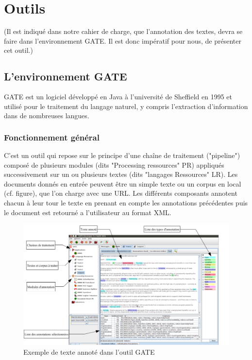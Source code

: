 \documentclass[a4paper, 11pt]{report}
\begin{document}
\section{Outils}%
(Il est indiqué dans notre cahier de charge, que l'annotation des textes, devra se faire dans l'environnement GATE. Il est donc impératif pour nous, de présenter cet outil.)
\subsection{L'environnement GATE}
GATE est un logiciel développé en Java à l’université de Sheffield en 1995 et utilisé pour
le traitement du langage naturel, y compris l’extraction d’information dans de nombreuses
langues. 
\subsubsection{Fonctionnement général}
C'est un outil qui repose sur le principe d'une chaîne de traitement ("pipeline") composé de plusieurs modules (dits "Processing ressources" PR) appliqués successivement sur un ou plusieurs textes (dits "langages Ressources" LR). Les documents donnés en entrée peuvent être un simple texte ou un corpus en local (cf. figure), que l'on charge avec une URL. Les différents composants annotent chacun à leur tour le texte en prenant en compte les annotations précédentes puis le document est retourné a l'utilisateur au format XML.
\begin{figure}[H]
\begin{center}
\includegraphics[scale=0.3]{img/exempleAnnotationGATE.png} 
\end{center}
\caption{Exemple de texte annoté dans l'outil GATE}
\end{figure}
\end{document}
